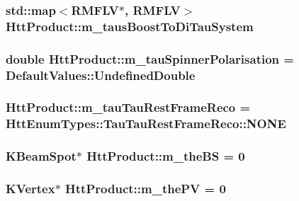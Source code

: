 \label{classHttProduct_aa0c3f0fdfab21ffb2f82fd856dc54410}
\hypertarget{classHttProduct_aea1e343fbe03ad6d80b4390c49592699}{
\subsubsection[{m\_\-tausBoostToDiTauSystem}]{\setlength{\rightskip}{0pt plus 5cm}std::map$<$RMFLV$\ast$, RMFLV$>$ {\bf HttProduct::m\_\-tausBoostToDiTauSystem}}}
\label{classHttProduct_aea1e343fbe03ad6d80b4390c49592699}
\hypertarget{classHttProduct_a07f77401cf50bb193347cbec02ebae05}{
\subsubsection[{m\_\-tauSpinnerPolarisation}]{\setlength{\rightskip}{0pt plus 5cm}double {\bf HttProduct::m\_\-tauSpinnerPolarisation} = DefaultValues::UndefinedDouble}}
\label{classHttProduct_a07f77401cf50bb193347cbec02ebae05}
\hypertarget{classHttProduct_af34a6998b5fe3ae490f3e4be430b9333}{
\subsubsection[{m\_\-tauTauRestFrameReco}]{ {\bf HttProduct::m\_\-tauTauRestFrameReco} = HttEnumTypes::TauTauRestFrameReco::NONE}}
\label{classHttProduct_af34a6998b5fe3ae490f3e4be430b9333}
\hypertarget{classHttProduct_a21bfcdace50cb23137eb9cd1c6de4f0a}{
\subsubsection[{m\_\-theBS}]{\setlength{\rightskip}{0pt plus 5cm}KBeamSpot$\ast$ {\bf HttProduct::m\_\-theBS} = 0}}
\label{classHttProduct_a21bfcdace50cb23137eb9cd1c6de4f0a}
\hypertarget{classHttProduct_ad59601b3ebee99a873ca371e79cbd1c4}{
\subsubsection[{m\_\-thePV}]{\setlength{\rightskip}{0pt plus 5cm}KVertex$\ast$ {\bf HttProduct::m\_\-thePV} = 0}}
